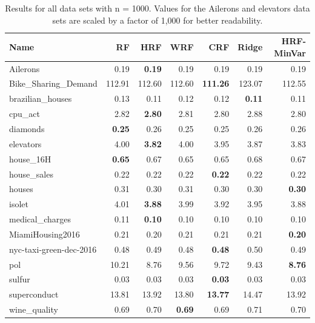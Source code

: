 \begin{table}[ht]
\centering
\begingroup\scriptsize
\begin{tabular}{lrrrrrr}
  \hline
\textbf{ Name } & \textbf{ RF } & \textbf{ HRF } & \textbf{ WRF } & \textbf{ CRF } & \textbf{ Ridge } & \textbf{ HRF-MinVar } \\ 
  \hline
Ailerons & 0.19 & \textbf{0.19} & 0.19 & 0.19 & 0.19 & 0.19 \\ 
  Bike\_Sharing\_Demand & 112.91 & 112.60 & 112.60 & \textbf{111.26} & 123.07 & 112.55 \\ 
  brazilian\_houses & 0.13 & 0.11 & 0.12 & 0.12 & \textbf{0.11} & 0.11 \\ 
  cpu\_act & 2.82 & \textbf{2.80} & 2.81 & 2.80 & 2.88 & 2.80 \\ 
  diamonds & \textbf{0.25} & 0.26 & 0.25 & 0.25 & 0.26 & 0.26 \\ 
  elevators & 4.00 & \textbf{3.82} & 4.00 & 3.95 & 3.87 & 3.83 \\ 
  house\_16H & \textbf{0.65} & 0.67 & 0.65 & 0.65 & 0.68 & 0.67 \\ 
  house\_sales & 0.22 & 0.22 & 0.22 & \textbf{0.22} & 0.22 & 0.22 \\ 
  houses & 0.31 & 0.30 & 0.31 & 0.30 & 0.30 & \textbf{0.30} \\ 
  isolet & 4.01 & \textbf{3.88} & 3.99 & 3.92 & 3.95 & 3.88 \\ 
  medical\_charges & 0.11 & \textbf{0.10} & 0.10 & 0.10 & 0.10 & 0.10 \\ 
  MiamiHousing2016 & 0.21 & 0.20 & 0.21 & 0.21 & 0.21 & \textbf{0.20} \\ 
  nyc-taxi-green-dec-2016 & 0.48 & 0.49 & 0.48 & \textbf{0.48} & 0.50 & 0.49 \\ 
  pol & 10.21 & 8.76 & 9.56 & 9.72 & 9.43 & \textbf{8.76} \\ 
  sulfur & 0.03 & 0.03 & 0.03 & \textbf{0.03} & 0.03 & 0.03 \\ 
  superconduct & 13.81 & 13.92 & 13.80 & \textbf{13.77} & 14.47 & 13.92 \\ 
  wine\_quality & 0.69 & 0.70 & \textbf{0.69} & 0.69 & 0.71 & 0.70 \\ 
   \hline
\end{tabular}
\endgroup
\caption{Results for all data sets with n = 1000. Values for the Ailerons and elevators data sets are scaled by a factor of 1,000 for better readability.} 
\end{table}
